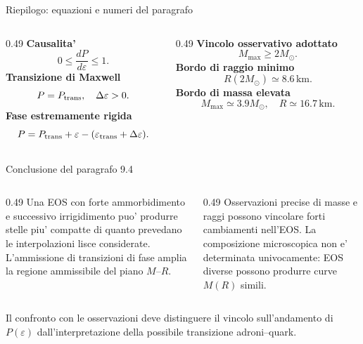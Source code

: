 \begin{frame}{Riepilogo: equazioni e numeri del paragrafo}
\footnotesize
\begin{columns}[T,onlytextwidth]
\begin{column}{0.49\textwidth}
\textbf{Causalita'}
\[
0\leq\frac{dP}{d\varepsilon}\leq1.
\]
\textbf{Transizione di Maxwell}
\[
P=P_{\rm trans},\quad\Delta\varepsilon>0.
\]
\textbf{Fase estremamente rigida}
\[
P=P_{\rm trans}+\varepsilon-
(\varepsilon_{\rm trans}+\Delta\varepsilon).
\]
\end{column}
\begin{column}{0.49\textwidth}
\textbf{Vincolo osservativo adottato}
\[
M_{\max}\geq2M_\odot.
\]
\textbf{Bordo di raggio minimo}
\[
R(2M_\odot)\simeq8.6\,\mathrm{km}.
\]
\textbf{Bordo di massa elevata}
\[
M_{\max}\simeq3.9M_\odot,
\quad R\simeq16.7\,\mathrm{km}.
\]
\end{column}
\end{columns}
\end{frame}

\begin{frame}{Conclusione del paragrafo 9.4}
\small
\begin{columns}[T,onlytextwidth]
\begin{column}{0.49\textwidth}
Una EOS con forte ammorbidimento e successivo irrigidimento puo' produrre stelle piu' compatte di quanto prevedano le interpolazioni lisce considerate.
\medskip
L'ammissione di transizioni di fase amplia la regione ammissibile del piano $M$--$R$.
\end{column}
\begin{column}{0.49\textwidth}
Osservazioni precise di masse e raggi possono vincolare forti cambiamenti nell'EOS.
\medskip
La composizione microscopica non e' determinata univocamente: EOS diverse possono produrre curve $M(R)$ simili.
\end{column}
\end{columns}
\medskip
Il confronto con le osservazioni deve distinguere il vincolo sull'andamento di $P(\varepsilon)$ dall'interpretazione della possibile transizione adroni--quark.
\end{frame}

